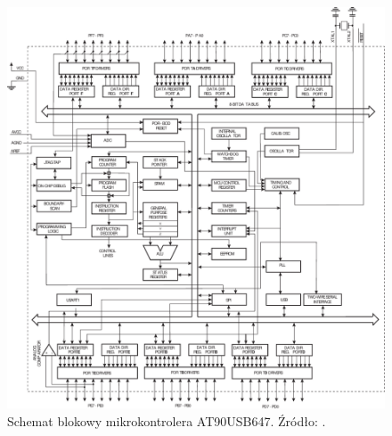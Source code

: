 \begin{figure}[t]
    \begin{center}
       \includegraphics[width=\textwidth]{figures/avrdiagram.pdf}
    \end{center}

    \caption{Schemat blokowy mikrokontrolera AT90USB647. Źródło: \cite{ds-avr}.}
    \label{blokowy-avr}
\end{figure}

